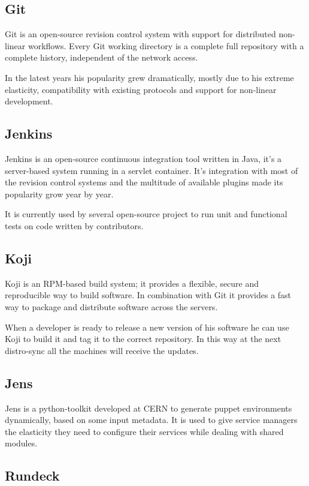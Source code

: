 \subsection{Git}

Git is an open-source revision control system with support for distributed
non-linear workflows. Every Git working directory is a complete full
repository with a complete history, independent of the network access.

In the latest years his popularity grew dramatically, mostly due to his
extreme elasticity, compatibility with existing protocols and support for
non-linear development.

\subsection{Jenkins}

Jenkins is an open-source continuous integration tool written in Java,
it's a server-based system running in a servlet container. It's
integration with most of the revision control systems and the multitude of
available plugins made its popularity grow year by year.

It is currently used by several open-source project to run unit and
functional tests on code written by contributors.

\subsection{Koji}

Koji is an RPM-based build system; it provides a flexible, secure and
reproducible way to build software. In combination with Git it provides
a fast way to package and distribute software across the servers.

When a developer is ready to release a new version of his software he can
use Koji to build it and tag it to the correct repository. In this way at
the next distro-sync all the machines will receive the updates.

\subsection{Jens}

Jens is a python-toolkit developed at CERN to generate puppet environments
dynamically, based on some input metadata. It is used to give service
managers the elasticity they need to configure their services while
dealing with shared modules.

\subsection{Rundeck}

